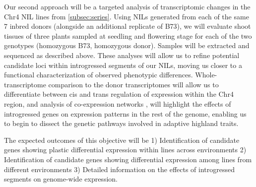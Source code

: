 Our second approach will be a targeted analysis of transcriptomic changes in the Chr4 NIL lines from \ref{subsec:series}.  Using NILs generated from each of the same 7 inbred donors (alongside an additional replicate of B73), we will evaluate shoot tissues of three plants sampled at seedling and flowering stage for each of the two genotypes (homozygous B73, homozygous donor).  Samples will be extracted and sequenced as described above. These analyses will allow us to refine potential candidate loci within introgressed segments of our NILs, moving us closer to a functional characterization of observed phenotypic differences. Whole-transcriptome comparison to the donor transcriptomes will allow us to differentiate between cis and trans regulation of expression within the Chr4 region, and analysis of co-expression networks \citep[c.f.][]{Swanson-Wagner02072012}, will highlight the effects of introgressed genes on expression patterns in the rest of the genome, enabling us to begin to dissect the genetic pathways involved in adaptive highland traits.

The expected outcomes of this objective will be 1) Identification of candidate genes showing plastic differential expression within lines across environments 2) Identification of candidate genes showing differential expression among lines from different environments 3) Detailed information on the effects of introgressed segments on genome-wide expression. 


